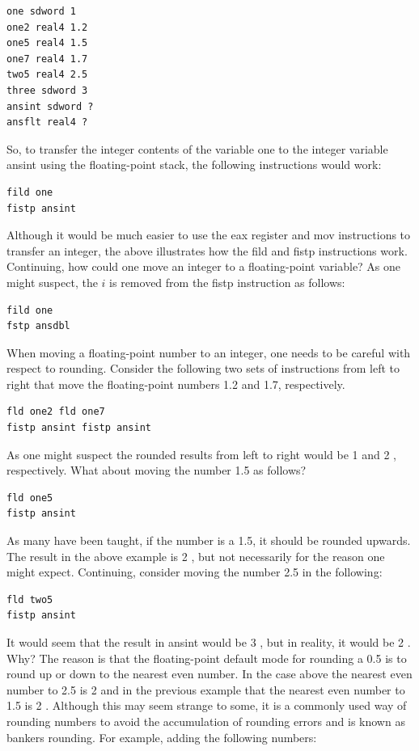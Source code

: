 \documentclass[10pt]{book}
\begin{document}
\begin{verbatim}
one sdword 1
one2 real4 1.2
one5 real4 1.5
one7 real4 1.7
two5 real4 2.5
three sdword 3
ansint sdword ?
ansflt real4 ?
\end{verbatim}

So, to transfer the integer contents of the variable one to the integer variable ansint using the floating-point stack, the following instructions would work:

\begin{verbatim}
fild one
fistp ansint
\end{verbatim}

Although it would be much easier to use the eax register and mov instructions to transfer an integer, the above illustrates how the fild and fistp instructions work. Continuing, how could one move an integer to a floating-point variable? As one might suspect, the $i$ is removed from the fistp instruction as follows:

\begin{verbatim}
fild one
fstp ansdbl
\end{verbatim}

When moving a floating-point number to an integer, one needs to be careful with respect to rounding. Consider the following two sets of instructions from left to right that move the floating-point numbers 1.2 and 1.7, respectively.


\begin{verbatim}
fld one2 fld one7
fistp ansint fistp ansint
\end{verbatim}

As one might suspect the rounded results from left to right would be 1 and 2 , respectively. What about moving the number 1.5 as follows?

\begin{verbatim}
fld one5
fistp ansint
\end{verbatim}

As many have been taught, if the number is a 1.5, it should be rounded upwards. The result in the above example is 2 , but not necessarily for the reason one might expect. Continuing, consider moving the number 2.5 in the following:

\begin{verbatim}
fld two5
fistp ansint
\end{verbatim}

It would seem that the result in ansint would be 3 , but in reality, it would be 2 . Why? The reason is that the floating-point default mode for rounding a 0.5 is to round up or down to the nearest even number. In the case above the nearest even number to 2.5 is 2 and in the previous example that the nearest even number to 1.5 is 2 . Although this may seem strange to some, it is a commonly used way of rounding numbers to avoid the accumulation of rounding errors and is known as bankers rounding. For example, adding the following numbers:
\end{document}

